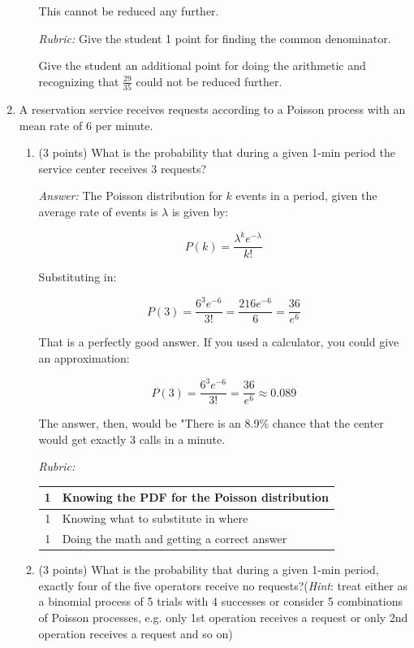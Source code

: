 \documentclass[letterpaper,12pt,addpoints]{exam}
\begin{document}
\begin{enumerate}
\begin{enumerate}
\begin{minipage}[t]{0.50\textwidth}
This cannot be reduced any further.

\end{minipage}
\hspace{0.05\textwidth}
\begin{minipage}[t]{0.40\textwidth}
\textit{Rubric:}  Give the student 1 point for finding the common denominator.  

Give the student an additional point for doing the arithmetic and recognizing that $\frac{29}{35}$ could not be reduced further.
\end{minipage}

\end{enumerate}

\item A reservation service receives requests according to a Poisson process with an mean rate of 6 per minute.
\begin{enumerate}
\item (3 points) What is the probability that during a given 1-min period the service center receives 3 requests?

\begin{minipage}[t]{0.50\textwidth}

\textit{Answer:} The Poisson distribution for $k$ events in a period, given the average rate of events is $\lambda$ is given by:

$$P(k) = \frac{\lambda^{k}e^{-\lambda}}{k!}$$

Substituting in:

$$P(3) = \frac{6^{3}e^{-6}}{3!} =  \frac{216e^{-6}}{6} = \frac{36}{e^6}$$

That is a perfectly good answer.  If you used a calculator, you could give an approximation:

$$P(3) = \frac{6^{3}e^{-6}}{3!} = \frac{36}{e^6} \approx 0.089$$

The answer, then, would be "There is an 8.9\% chance that the center would get exactly 3 calls in a minute.

\end{minipage}
\hspace{0.05\textwidth}
\begin{minipage}[t]{0.40\textwidth}
\textit{Rubric:} 

\begin{tabular}{c|p{1.5in}}
1 & Knowing the  PDF for the Poisson distribution \\
\hline
1 & Knowing what to substitute in where\\
\hline
1 & Doing the math and getting a correct answer
\end{tabular}
\end{minipage}

\item (3 points) What is the probability that during a given 1-min period, exactly four of the five operators receive no requests?(\textit{Hint}: treat either as a binomial process of 5 trials with 4 successes or consider 5 combinations of Poisson processes, e.g. only 1st operation receives a request  or only 2nd operation receives a request and so on)
\end{enumerate}

\end{enumerate}
\end{document}
